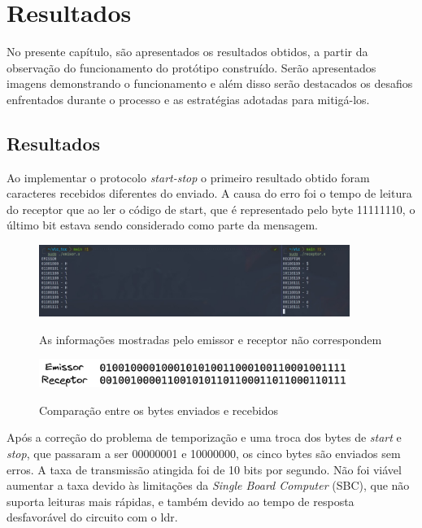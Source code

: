\section{Resultados}

No presente capítulo, são apresentados os resultados obtidos, a partir da observação do funcionamento do protótipo construído. Serão apresentados imagens demonstrando o funcionamento e além disso serão destacados os desafios enfrentados durante o processo e as estratégias adotadas para mitigá-los.

\subsection{Resultados}

Ao implementar o protocolo \textit{start-stop} o primeiro resultado obtido foram caracteres recebidos diferentes do enviado. A causa do erro foi o tempo de leitura do receptor que ao ler o código de start, que é representado pelo byte 11111110, o último bit estava sendo considerado como parte da mensagem.

\begin{figure}[!htbp]
  \caption{As informações mostradas pelo emissor e receptor não correspondem}
  \includegraphics[width=0.9\textwidth]{images/vlc_erro_1.jpeg}
  \label{primeiro_erro}
\end{figure}

\begin{figure}[!htbp]
  \caption{Comparação entre os bytes enviados e recebidos}
  \includegraphics[width=0.9\textwidth]{images/comparacao_msg_emissor_recptor_erro.png}
  \label{comparaca_msg_emissor_recptor_erro}
\end{figure}

Após a correção do problema de temporização e uma troca dos bytes de \textit{start} e \textit{stop}, que passaram a ser 00000001 e 10000000, os cinco bytes são enviados sem erros. A taxa de transmissão atingida foi de 10 bits por segundo. Não foi viável aumentar a taxa devido às limitações da \textit{Single Board Computer} (SBC), que não suporta leituras mais rápidas, e também devido ao tempo de resposta desfavorável do circuito com o ldr.

